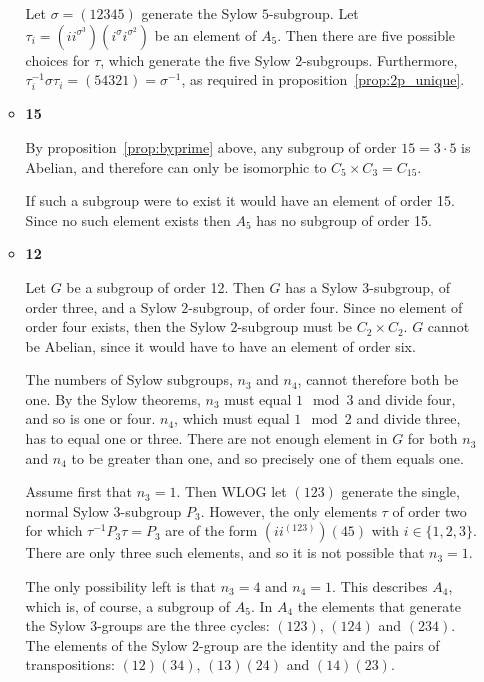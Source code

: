 \documentclass[11pt]{article} \usepackage{amssymb}
\begin{document}
\begin{enumerate}
\begin{itemize}
      Let $\sigma=(12345)$ generate the Sylow 
      $5$-subgroup. Let 
      $\tau_i=\left(ii^{\sigma^3}\right)\left(i^{\sigma}i^{\sigma^2}\right)$ 
      be an element of $A_5$. Then there are five possible
      choices for $\tau$, which generate the five Sylow $2$-subgroups. Furthermore, 
      $\tau_i^{-1}\sigma\tau_i=(54321)=\sigma^{-1}$, as 
      required in proposition~\ref{prop:2p_unique}.

    \item {\bf 15}
      
      By proposition~\ref{prop:byprime} above, any subgroup of order $15=3\cdot 5$
      is Abelian, and therefore can only be isomorphic to 
      $C_5\times C_3=C_{15}$. 

      If such a subgroup were to exist it would have an element of order 15. 
      Since no such element exists then $A_5$ has no subgroup of order 15.

    \item {\bf 12}
      
      Let $G$ be a subgroup of order 12. Then $G$ has a Sylow $3$-subgroup,
      of order three, and a Sylow $2$-subgroup, of order four. Since no 
      element of order four exists, then the Sylow $2$-subgroup must be 
      $C_2\times C_2$. $G$ cannot be Abelian, since it would have to have 
      an element of order six.

      The numbers of Sylow subgroups, $n_3$ and $n_4$, cannot therefore both
      be one. By the Sylow theorems, $n_3$ must equal $1\mod 3$ and divide
      four, and so is one or four. $n_4$, which must equal $1\mod 2$ and divide
      three, has to equal one or three. There are not enough element in $G$
      for both $n_3$ and $n_4$ to be greater than one, and so precisely one
      of them equals one.

      Assume first that $n_3=1$. Then WLOG let $(123)$ generate the single,
      normal Sylow $3$-subgroup $P_3$. However, the only elements $\tau$ of
      order two for which $\tau^{-1}P_3\tau=P_3$ are of the form $(ii^{(123)})(45)$ with
      $i\in\{1,2,3\}$. There are only three such elements, and so it is not
      possible that $n_3=1$.

      The only possibility left is that $n_3=4$ and $n_4=1$. This describes
      $A_4$, which is, of course, a subgroup of $A_5$. In $A_4$ the elements that
      generate the Sylow $3$-groups are the three cycles: $(123)$, $(124)$ and 
      $(234)$. The elements of the Sylow $2$-group are the identity and the 
      pairs of transpositions: $(12)(34)$, $(13)(24)$ and $(14)(23)$. 
      

\end{itemize}
\end{enumerate}
\end{document}
